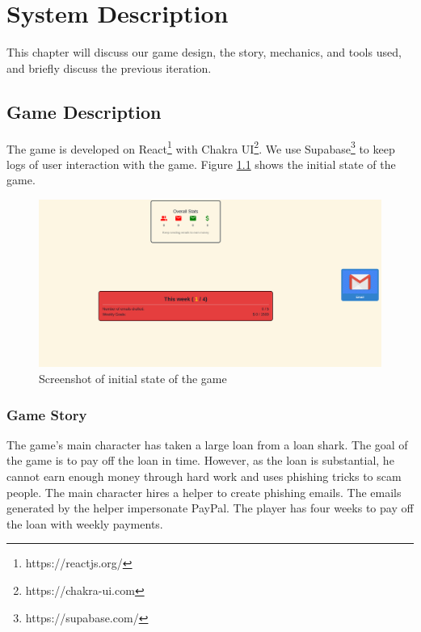 




\chapter{System Description}

This chapter will discuss our game design, the story, mechanics, and tools used, and briefly discuss the previous iteration.

\section{Game Description}
The game is developed on React\footnote{https://reactjs.org/} with Chakra UI\footnote{https://chakra-ui.com}. We use Supabase\footnote{https://supabase.com/} to keep logs of user interaction with the game. Figure \ref{fig:screenshot} shows the initial state of the game.

\begin{figure}[h]
    \centering
    \includegraphics[width=\textwidth]{figures/section2/game.png}
    \caption{Screenshot of initial state of the game}
    \label{fig:screenshot}
\end{figure}

\subsection{Game Story}
The game's main character has taken a large loan from a loan shark. The goal of the game is to pay off the loan in time. However, as the loan is substantial, he cannot earn enough money through hard work and uses phishing tricks to scam people. The main character hires a helper to create phishing emails. The emails generated by the helper impersonate PayPal. The player has four weeks to pay off the loan with weekly payments.

